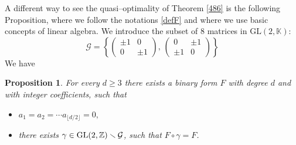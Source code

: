 \documentclass[10pt]{article}
\newtheorem{proposition}[theorem]{Proposition}
\theoremstyle{definition}
\numberwithin{equation}{section}
\newcommand {\Z}{{\mathbb{Z}}}
\newcommand {\K}{{\mathbb{K}}}
\newcommand{\GL}{\mathrm {GL}}
\begin{document}
A different way to see the quasi--optimality of Theorem \ref{486} is the following Proposition, where we follow the notations \eqref{defF} and where we use basic concepts of linear algebra. We introduce the subset of $8$ matrices in $\GL(2,\K)$: 
\[ 
\mathcal G=
\left\{ \begin{pmatrix} \pm 1&0\\0&\pm 1\end{pmatrix}, \, \begin{pmatrix} 0&\pm 1\\\pm 1&0\end{pmatrix}\right\}  
\]
 We have
\begin{proposition} For every $d\geqslant 3$ there exists a binary form $F$ with degree $d$ and with integer coefficients, such that
\begin{itemize}
\item $a_1=a_2=\cdots a_{\lfloor d/2\rfloor}=0,$
\item there exists $\gamma\in {\rm GL}(2,\Z)\smallsetminus \mathcal G$, such that $F\circ \gamma =F$.
\end{itemize}

\end{proposition}
\end{document}

